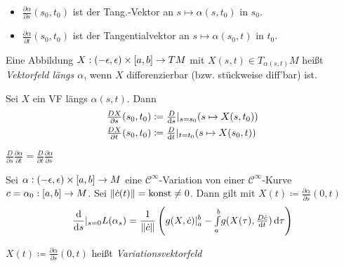 \documentclass{cheat-sheet}
\newcommand{\vinterval}{\ointerval{-\epsilon}{\epsilon}} %
\begin{document}
\begin{nota}
  \begin{itemize}
    \item $\tfrac{\partial \alpha}{\partial s} (s_0, t_0)$ ist der Tang.-Vektor an $s {\mapsto} \alpha(s, t_0)$ in $s_0$.
    \item $\tfrac{\partial \alpha}{\partial t} (s_0, t_0)$ ist der Tangentialvektor an $s \mapsto \alpha(s_0, t)$ in $t_0$.
  \end{itemize}
\end{nota}

\begin{defn}
  Eine Abbildung $X : \vinterval \times \cinterval{a}{b} \to TM$ mit $X(s, t) \in T_{\alpha(s, t)} M$ heißt \emph{Vektorfeld längs $\alpha$}, wenn $X$ differenzierbar (bzw. stückweise diff'bar) ist.
\end{defn}

\begin{nota}
  Sei $X$ ein VF längs $\alpha(s, t)$. Dann
  \begin{align*}
    \tfrac{D X}{\partial s} (s_0, t_0) & \coloneqq \tfrac{D}{\mathrm{d} s} |_{s=s_0} (s \mapsto X(s, t_0)) \\
    \tfrac{D X}{\partial t} (s_0, t_0) & \coloneqq \tfrac{D}{\mathrm{d} t} |_{t=t_0} (s \mapsto X(s_0, t))
  \end{align*}
\end{nota}

\begin{lem}
  $\frac{D}{\partial s} \frac{\partial \alpha}{\partial t} = \frac{D}{\partial t} \frac{\partial \alpha}{\partial s}$
\end{lem}

\begin{satz}
  Sei $\alpha : \vinterval \times \cinterval{a}{b} \to M$ eine $\mathcal{C}^\infty$-Variation von einer $\mathcal{C}^\infty$-Kurve $c = \alpha_0 : \left[ a, b \right] \to M$. Sei $\lVert\dot{c}(t)\rVert = \text{konst} \not= 0$. Dann gilt mit $X(t) \coloneqq \tfrac{\partial \alpha}{\partial s} (0, t)$
  \[ \frac{\mathrm{d}}{\mathrm{d} s} |_{s=0} L(\alpha_s) = \frac{1}{\lVert\dot{c}\rVert} \left( g(X, \dot{c})|_a^b - {\textstyle \int\limits_{a}^{b}} g(X(\tau), \tfrac{D \dot{c}}{\mathrm{d} t}) \,\mathrm{d} \tau \right) \]
\end{satz}

\begin{sprech}
  $X(t) \coloneqq \tfrac{\partial \alpha}{\partial s} (0, t)$ heißt \emph{Variationsvektorfeld}
\end{sprech}
\end{document}
